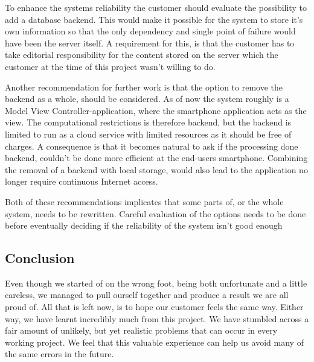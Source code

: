 To enhance the systems reliability the customer should evaluate the possibility to add a database backend. This would make it possible for the system to store it's own information so that the only dependency and single point of failure would have been the server itself. A requirement for this, is that the customer has to take editorial responsibility for the content stored on the server which the customer at the time of this project wasn't willing to do.

Another recommendation for further work is that the option to remove the backend as a whole, should be considered. As of now the system roughly is a Model View Controller-application, where the smartphone application acts as the view. The computational restrictions is therefore backend, but the backend is limited to run as a cloud service with limited resources as it should be free of charges. A consequence is that it becomes natural to ask if the processing done backend, couldn't be done more efficient at the end-users smartphone. Combining the removal of a backend with local storage, would also lead to the application no longer require continuous Internet access.

Both of these recommendations implicates that some parts of, or the whole system, needs to be rewritten. Careful evaluation of the options needs to be done before eventually deciding if the reliability of the system isn't good enough

 
\subsection{Conclusion}

Even though we started of on the wrong foot, being both unfortunate and a little careless, we managed to pull ourself together and produce a result we are all proud of. All that is left now, is to hope our customer feels the same way. Either way, we have learnt incredibly much from this project. We have stumbled across a fair amount of unlikely, but yet realistic problems that can occur in every working project. We feel that this valuable experience can help us avoid many of the same errors in the future.